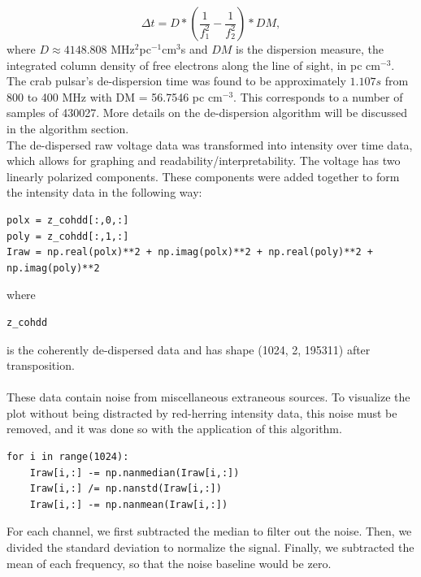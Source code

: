 \documentclass{article}
\begin{document}
 \begin{equation*}
     \Delta t = D*\left( \frac{1}{f_1^2} - \frac{1}{f_2^2}\right)*DM,
 \end{equation*}
 where $D \approx 4148.808$  MHz$^{2}$pc$^{-1}$cm$^3$s and $DM$ is the dispersion measure, the integrated column density of free electrons along the line of sight, in pc cm$^{-3}$. The crab pulsar's de-dispersion time was found to be approximately $1.107 s$ from 800 to 400 MHz with DM = 56.7546 pc cm$^{-3}.$ This corresponds to a number of samples of 430027. More details on the de-dispersion algorithm will be discussed in the algorithm section.\\

The de-dispersed raw voltage data was transformed into intensity over time data, which allows for graphing and readability/interpretability. The voltage has two linearly polarized components. These components were added together to form the intensity data in the following way:
\begin{lstlisting}
polx = z_cohdd[:,0,:]
poly = z_cohdd[:,1,:]
Iraw = np.real(polx)**2 + np.imag(polx)**2 + np.real(poly)**2 + np.imag(poly)**2
\end{lstlisting}
where 
\begin{lstlisting}
z_cohdd
\end{lstlisting} is the coherently de-dispersed data and has shape (1024, 2, 195311) after transposition.\\
\\
These data contain noise from miscellaneous extraneous sources. To visualize the plot without being distracted by red-herring intensity data, this noise must be removed, and it was done so with the application of this algorithm.

\begin{lstlisting}
for i in range(1024):
    Iraw[i,:] -= np.nanmedian(Iraw[i,:]) 
    Iraw[i,:] /= np.nanstd(Iraw[i,:])
    Iraw[i,:] -= np.nanmean(Iraw[i,:])
\end{lstlisting}
For each channel, we first subtracted the median to filter out the noise. Then, we divided the standard deviation to normalize the signal. Finally, we subtracted the mean of each frequency, so that the noise baseline would be zero.
\\
\end{document}
